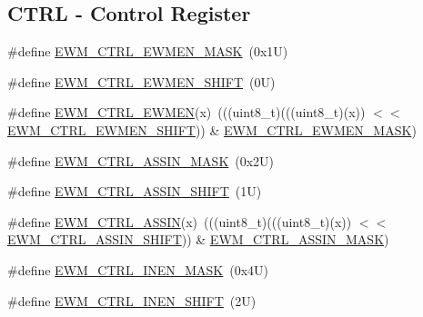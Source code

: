 \subsection*{C\+T\+RL -\/ Control Register}
\begin{DoxyCompactItemize}
\item 
\#define \mbox{\hyperlink{group___e_w_m___register___masks_ga7426f0a484ad28b92efb90ef0e3f01fd}{E\+W\+M\+\_\+\+C\+T\+R\+L\+\_\+\+E\+W\+M\+E\+N\+\_\+\+M\+A\+SK}}~(0x1\+U)
\item 
\#define \mbox{\hyperlink{group___e_w_m___register___masks_gafac96f184ce423d5872e0ca6e258d004}{E\+W\+M\+\_\+\+C\+T\+R\+L\+\_\+\+E\+W\+M\+E\+N\+\_\+\+S\+H\+I\+FT}}~(0\+U)
\item 
\#define \mbox{\hyperlink{group___e_w_m___register___masks_ga2b23b7325df8fa73742feac3fbf5863a}{E\+W\+M\+\_\+\+C\+T\+R\+L\+\_\+\+E\+W\+M\+EN}}(x)~(((uint8\+\_\+t)(((uint8\+\_\+t)(x)) $<$$<$ \mbox{\hyperlink{group___e_w_m___register___masks_gafac96f184ce423d5872e0ca6e258d004}{E\+W\+M\+\_\+\+C\+T\+R\+L\+\_\+\+E\+W\+M\+E\+N\+\_\+\+S\+H\+I\+FT}})) \& \mbox{\hyperlink{group___e_w_m___register___masks_ga7426f0a484ad28b92efb90ef0e3f01fd}{E\+W\+M\+\_\+\+C\+T\+R\+L\+\_\+\+E\+W\+M\+E\+N\+\_\+\+M\+A\+SK}})
\item 
\#define \mbox{\hyperlink{group___e_w_m___register___masks_ga24fe6289cbd9e813f99fb721d28b7bb5}{E\+W\+M\+\_\+\+C\+T\+R\+L\+\_\+\+A\+S\+S\+I\+N\+\_\+\+M\+A\+SK}}~(0x2\+U)
\item 
\#define \mbox{\hyperlink{group___e_w_m___register___masks_gac397960fb320e62f5c89e057e9f5ce13}{E\+W\+M\+\_\+\+C\+T\+R\+L\+\_\+\+A\+S\+S\+I\+N\+\_\+\+S\+H\+I\+FT}}~(1\+U)
\item 
\#define \mbox{\hyperlink{group___e_w_m___register___masks_gaaca88cbfdf1d00590a8ef3be3db9e06d}{E\+W\+M\+\_\+\+C\+T\+R\+L\+\_\+\+A\+S\+S\+IN}}(x)~(((uint8\+\_\+t)(((uint8\+\_\+t)(x)) $<$$<$ \mbox{\hyperlink{group___e_w_m___register___masks_gac397960fb320e62f5c89e057e9f5ce13}{E\+W\+M\+\_\+\+C\+T\+R\+L\+\_\+\+A\+S\+S\+I\+N\+\_\+\+S\+H\+I\+FT}})) \& \mbox{\hyperlink{group___e_w_m___register___masks_ga24fe6289cbd9e813f99fb721d28b7bb5}{E\+W\+M\+\_\+\+C\+T\+R\+L\+\_\+\+A\+S\+S\+I\+N\+\_\+\+M\+A\+SK}})
\item 
\#define \mbox{\hyperlink{group___e_w_m___register___masks_ga4366a1e4b346e8a61898588faa0ca7df}{E\+W\+M\+\_\+\+C\+T\+R\+L\+\_\+\+I\+N\+E\+N\+\_\+\+M\+A\+SK}}~(0x4\+U)
\item 
\#define \mbox{\hyperlink{group___e_w_m___register___masks_ga64cbcf45aac428b81d2ed6aab3cd0fe2}{E\+W\+M\+\_\+\+C\+T\+R\+L\+\_\+\+I\+N\+E\+N\+\_\+\+S\+H\+I\+FT}}~(2\+U)

\end{DoxyCompactItemize}
